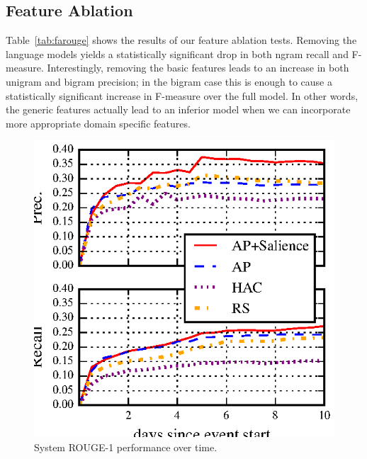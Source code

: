 \subsection{Feature Ablation}


Table~\ref{tab:farouge} shows the results of our feature ablation
tests. Removing the language models yields a statistically 
significant drop in both ngram recall and F-measure. 
Interestingly, removing the basic features leads to an
increase in both unigram and bigram precision; in the bigram
case this is enough to cause a statistically significant increase
in F-measure over the full model. In other words, the generic features
actually lead to an inferior model when we can incorporate more appropriate
domain specific features. 



\begin{figure}
    \includegraphics[]{rouge-time.eps}
\caption{System ROUGE-1 performance over time.}
\label{fig:trouge}
\end{figure}

